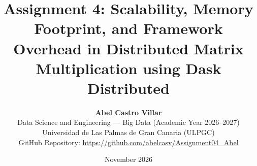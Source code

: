 \documentclass[11pt,a4paper]{article}
\begin{document}
\title{\vspace{-1.3cm}\textbf{Assignment 4: Scalability, Memory Footprint, and Framework Overhead in Distributed Matrix Multiplication using Dask Distributed}}
\author{
    \textbf{Abel Castro Villar}\\
    Data Science and Engineering --- Big Data (Academic Year 2026--2027)\\
    Universidad de Las Palmas de Gran Canaria (ULPGC)\\
    GitHub Repository: \url{https://github.com/abelcasv/Assignment04_Abel}
}
\date{November 2026}

\maketitle
\vspace{-0.55cm}
\end{document}
